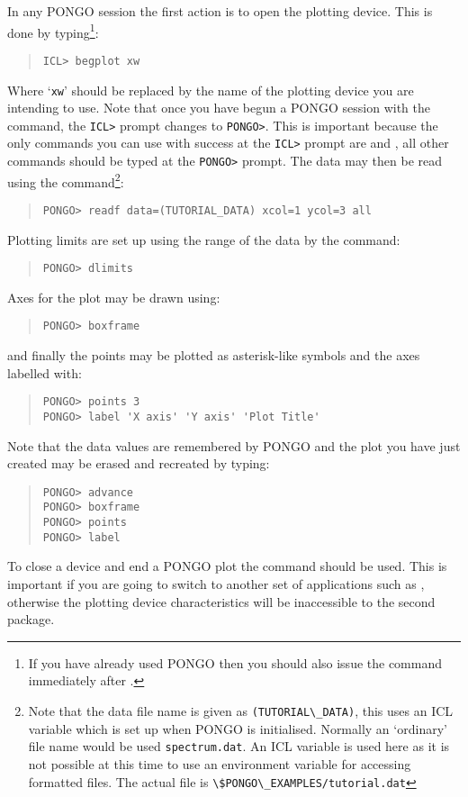 In any PONGO session the first action is to open the plotting device.
This is done by typing\footnote{ If you have already used PONGO then
you should also issue the  command immediately
after .}:
\begin{quote}
\begin{verbatim}
ICL> begplot xw
\end{verbatim}
\end{quote}
Where `\verb+xw+' should be replaced by the name of the plotting device you
are intending to use.  Note that once you have begun a PONGO session
with the  command, the \verb+ICL>+ prompt changes
to \verb+PONGO>+.  This is important because the only commands you can
use with success at the \verb+ICL>+ prompt are 
and , all other commands should be typed at the
\verb+PONGO>+ prompt.  The data may then be read using the
command\footnote{ Note that the data file name is given as
\verb+(TUTORIAL\_DATA)+, this uses an ICL variable which is set up
when PONGO is initialised. Normally an `ordinary' file name would be
used \ie \verb+spectrum.dat+. An ICL variable is used here as it is
not possible at this time to use an environment variable for accessing
formatted files. The actual file is
\verb+\$PONGO\_EXAMPLES/tutorial.dat+}:
\begin{quote}
\begin{verbatim}
PONGO> readf data=(TUTORIAL_DATA) xcol=1 ycol=3 all
\end{verbatim}
\end{quote}
Plotting limits are set up using the range of the data by the command:
\begin{quote}
\begin{verbatim}
PONGO> dlimits
\end{verbatim}
\end{quote}
Axes for the plot may be drawn using:
\begin{quote}
\begin{verbatim}
PONGO> boxframe
\end{verbatim}
\end{quote}
and finally the points may be plotted as asterisk-like symbols and the axes
labelled with:
\begin{quote}
\begin{verbatim}
PONGO> points 3
PONGO> label 'X axis' 'Y axis' 'Plot Title'
\end{verbatim}
\end{quote}
Note that the data values are remembered by PONGO and the plot you have
just created may be erased and recreated by typing:
\begin{quote}
\begin{verbatim}
PONGO> advance
PONGO> boxframe
PONGO> points
PONGO> label
\end{verbatim}
\end{quote}
To close a device and end a PONGO plot the command
 should be used.  This is important if you are
going to switch to another set of applications such as
, otherwise the plotting device characteristics
will be inaccessible to the second package.

